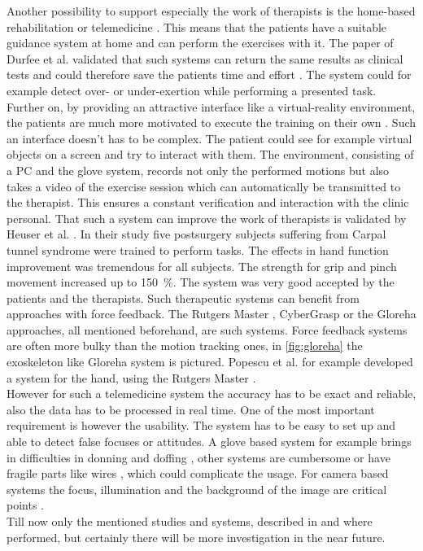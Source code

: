 Another possibility to support especially the work of therapists is the home-based rehabilitation or telemedicine \cite{metcalf2013markerless}. This means that the patients have a suitable guidance system at home and can perform the exercises with it. The paper of Durfee et al. validated that such systems can return the same results as clinical tests and could therefore save the patients time and effort \cite{durfee2007technical}. The system could for example detect over- or under-exertion while performing a presented task. Further on, by providing an attractive interface like a virtual-reality environment, the patients are much more motivated to execute the training on their own \cite{popescu2000virtual}. Such an interface doesn't has to be complex. The patient could see for example virtual objects on a screen and try to interact with them. The environment, consisting of a PC and the glove system, records not only the performed motions but also takes a video of the exercise session which can automatically be transmitted to the therapist. This ensures a constant verification and interaction with the clinic personal. That such a system can improve the work of therapists is validated by Heuser et al. \cite{heuser2007telerehabilitation}. In their study five postsurgery subjects suffering from Carpal tunnel syndrome were trained to perform tasks. The effects in hand function improvement was tremendous for all subjects. The strength for grip and pinch movement increased up to \SI{150}{\percent}. The system was very good accepted by the patients and the therapists. Such therapeutic systems can benefit from approaches with force feedback. The Rutgers Master , CyberGrasp or the Gloreha approaches, all mentioned beforehand, are such systems. Force feedback systems are often more bulky than the motion tracking ones, in \ref{fig:gloreha} the exoskeleton like Gloreha system is pictured. Popescu et al. \cite{popescu2000virtual} for example developed a system for the hand, using the Rutgers Master .\\ 
However for such a telemedicine system the accuracy has to be exact and reliable, also the data has to be processed in real time. One of the most important requirement is however the usability. The system has to be easy to set up and able to detect false focuses or attitudes. A glove based system for example brings in difficulties in donning and doffing \cite{metcalf2013markerless}, other systems are cumbersome or have fragile parts like wires \cite{bouzit2002rutgers}, which could complicate the usage. For camera based systems the focus, illumination and the background of the image are critical points \cite{ionescu2005dynamic}.\\
Till now only the mentioned studies and systems, described in \cite{heuser2007telerehabilitation} and \cite{popescu2000virtual} where performed, but certainly there will be more investigation in the near future.



